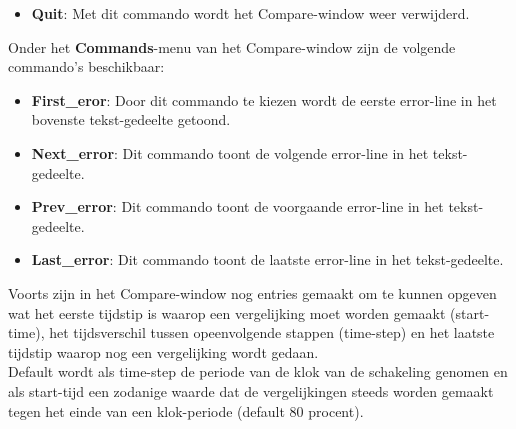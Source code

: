 \begin{itemize}
\begin{itemize}
\item {\bf Quit}: Met dit commando wordt het Compare-window weer verwijderd.
\end{itemize}
Onder het {\bf Commands}-menu van het Compare-window zijn de volgende commando's
beschikbaar:
\begin{itemize}
\item {\bf First\_eror}: Door dit commando te kiezen wordt de eerste error-line
                  in het bovenste tekst-gedeelte getoond.
\item {\bf Next\_error}: Dit commando toont de volgende error-line
                  in het tekst-gedeelte.
\item {\bf Prev\_error}: Dit commando toont de voorgaande error-line
                  in het tekst-gedeelte.
\item {\bf Last\_error}: Dit commando toont de laatste error-line
                  in het tekst-gedeelte.
\end{itemize}
Voorts zijn in het Compare-window nog entries gemaakt om te kunnen
opgeven wat het eerste tijdstip is waarop een vergelijking moet worden
gemaakt (start-time), het tijdsverschil tussen opeenvolgende stappen (time-step)
en het laatste tijdstip waarop nog een vergelijking wordt gedaan.\\
Default wordt als time-step de periode van de klok van de schakeling
genomen en als start-tijd een zodanige waarde dat de vergelijkingen steeds
worden gemaakt tegen het einde van een klok-periode (default 80 procent).


\end{itemize}
